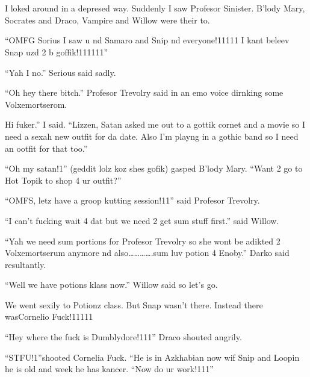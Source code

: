 \section{}


\XXX{\Xfill 666\Xfill}

I loked around in a depresed way. Suddenly I saw Profesor Sinister. B'lody Mary, Socrates and Draco, Vampire and Willow were their to.

\enquote{OMFG Sorius I saw u nd Samaro and Snip nd everyone!11111 I kant beleev Snap uzd 2 b goffik!111111}

\enquote{Yah I no.} Serious said sadly.

\enquote{Oh hey there bitch.} Profesor Trevolry said in an emo voice dirnking some Volxemortserom.

Hi fuker.'' I said. \enquote{Lizzen, Satan asked me out to a gottik cornet and a movie so I need a sexah new outfit for da date. Also I'm playng in a gothic band so I need an ootfit for that too.}

\enquote{Oh my satan!1} (geddit lolz koz shes gofik) gasped B'lody Mary. \enquote{Want 2 go to Hot Topik to shop 4 ur outfit?}

\begin{sloppypar}
    \enquote{OMFS, letz have a groop kutting session!11} said Profesor Trevolry.    
\end{sloppypar}

\enquote{I can't fucking wait 4 dat but we need 2 get sum stuff first.} said Willow.

\enquote{Yah we need sum portions for Profesor Trevolry so she wont be adikted 2 Volxemortserum anymore nd also………….sum luv potion 4 Enoby.} Darko said resultantly.

\enquote{Well we have potions klass now.} Willow said so let's go.

We went sexily to Potionz class. But Snap wasn't there. Instead there was\dotfill Cornelio Fuck!11111

\enquote{Hey where the fuck is Dumblydore!111} Draco shouted angrily.

\enquote{STFU\@!\@1\@}\@ shooted Cornelia Fuck. ``He is in Azkhabian now wif Snip and Loopin he is old and week he has kancer. \enquote{Now do ur work!111}

